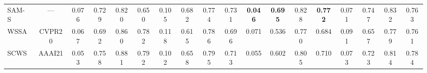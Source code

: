 \begin{table}[t]
{\begin{tabular}{l|c|cccc|cccc|cccc|cccc}
SAM-S~\cite{kirillov2023segment}                                         & \multicolumn{1}{c|}{---}                              & 0.076                                 & 0.729                                 & 0.820                                 & 0.650                                 & 0.105                                 & 0.682                                 & 0.774                                 & 0.731                                 & {\color[HTML]{00B0F0} \textbf{0.046}}                                & {\color[HTML]{00B0F0} \textbf{0.695}}                                 & 0.828                                 & {\color[HTML]{00B0F0} \textbf{0.772}}                                 & 0.071                                 & 0.747                                 & 0.832                                 & 0.763                                 \\
WSSA~\cite{zhang2020weakly}                                          & CVPR20                                             & 0.067                                 & 0.692                                 & 0.860                                 & 0.782                                 & 0.118                                 & 0.615                                 & 0.786                                 & 0.696                                 & 0.071                                 & 0.536                                 & 0.770                                 & 0.684                                 & 0.091                                 & 0.657                                 & 0.779                                 & 0.761                                 \\
SCWS~\cite{yu2021structure}                                       & AAAI21                                             & 0.053                                 & 0.758                                 & 0.881                                 & 0.792                                 & 0.102                                 & 0.658                                 & 0.795                                 & 0.713                                 & 0.055                                 & 0.602                                 & 0.805                                 & 0.710                                 & 0.073                                 & 0.723                                 & 0.814                                 & 0.784                                 \\

\end{tabular}}
\end{table}
